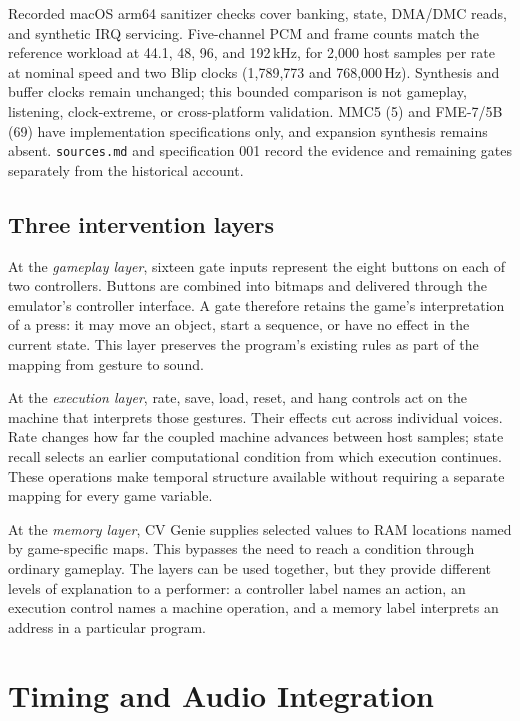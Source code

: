 \documentclass[10pt,letterpaper,twocolumn]{article}
\newcommand{\code}[1]{\texttt{#1}}
\begin{document}
Recorded macOS arm64 sanitizer checks cover banking, state, DMA/DMC reads,
and synthetic IRQ servicing. Five-channel PCM and frame counts match the
reference workload at 44.1, 48, 96, and 192\,kHz, for 2,000 host samples per
rate at nominal speed and two Blip clocks (1,789,773 and 768,000\,Hz).
Synthesis and buffer clocks remain unchanged; this bounded comparison is not
gameplay, listening, clock-extreme, or cross-platform validation.
MMC5 (5) and FME-7/5B (69) have implementation specifications only, and
expansion synthesis remains absent. \code{sources.md} and specification 001
record the evidence and remaining gates separately from the historical account.

\subsection{Three intervention layers}
At the \emph{gameplay layer}, sixteen gate inputs represent the eight buttons
on each of two controllers. Buttons are combined into bitmaps and delivered
through the emulator's controller interface. A gate therefore retains the
game's interpretation of a press: it may move an object, start a sequence, or
have no effect in the current state. This layer preserves the program's
existing rules as part of the mapping from gesture to sound.

At the \emph{execution layer}, rate, save, load, reset, and hang controls act on
the machine that interprets those gestures. Their effects cut across individual
voices. Rate changes how far the coupled machine advances between host samples;
state recall selects an earlier computational condition from which execution
continues. These operations make temporal structure available without requiring
a separate mapping for every game variable.

At the \emph{memory layer}, CV Genie supplies selected values to RAM locations
named by game-specific maps. This bypasses the need to reach a condition through
ordinary gameplay. The layers can be used together, but they provide different
levels of explanation to a performer: a controller label names an action, an
execution control names a machine operation, and a memory label interprets an
address in a particular program.

\section{Timing and Audio Integration}
\end{document}

